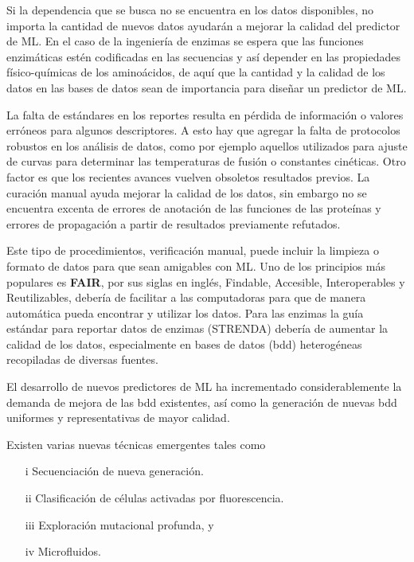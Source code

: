 \documentclass[12pt]{article}
\begin{document}
Si la dependencia que se busca no se encuentra en los datos disponibles, no importa la cantidad de nuevos datos ayudarán a mejorar la calidad del predictor de ML. En el caso de la ingeniería de enzimas se espera que las funciones enzimáticas estén codificadas en las secuencias y así depender en las propiedades físico-químicas de los aminoácidos, de aquí que la cantidad y la calidad de los datos en las bases de datos sean de importancia para diseñar un predictor de ML.


La falta de estándares en los reportes resulta en pérdida de información o valores erróneos para algunos descriptores. A esto hay que agregar la falta de protocolos robustos en los análisis de datos, como por ejemplo aquellos utilizados para ajuste de curvas para determinar las temperaturas de fusión o constantes cinéticas. Otro factor es que los recientes avances vuelven obsoletos resultados previos. La curación manual ayuda mejorar la calidad de los datos, sin embargo no se encuentra excenta de errores de anotación de las funciones de las proteínas y errores de propagación a partir de resultados previamente refutados.

Este tipo de procedimientos, verificación manual, puede incluir la limpieza o formato de datos para que sean amigables con ML. Uno de los principios más populares es \textbf{FAIR}, por sus siglas en inglés, Findable, Accesible, Interoperables y Reutilizables, debería de facilitar a las computadoras para que de manera automática pueda encontrar y utilizar los datos. Para las enzimas la guía estándar para reportar datos de enzimas (STRENDA) debería de aumentar la calidad de los datos, especialmente en bases de datos (bdd) heterogéneas recopiladas de diversas fuentes.


El desarrollo de nuevos predictores de ML ha incrementado considerablemente la demanda de mejora de las bdd existentes, así como la generación de nuevas bdd uniformes y representativas de mayor calidad. 

Existen varias nuevas técnicas emergentes tales como

\begin{itemize}
\item[i ] Secuenciación de nueva generación.
\item[ii ] Clasificación de células activadas por fluorescencia.
\item[iii ]  Exploración mutacional profunda, y  
\item[iv ] Microﬂuidos.

\end{itemize}
\end{document}
